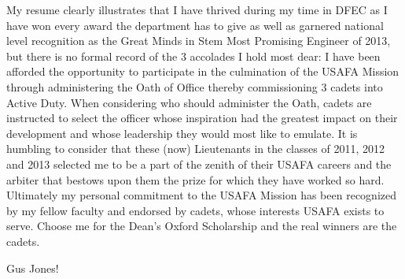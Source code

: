 \documentclass{article}
\begin{document}
My resume clearly illustrates that I have thrived during my time in DFEC as I
have won every award the department has to give as well as garnered national
level recognition as the Great Minds in Stem Most Promising Engineer of 2013,
but there is no formal record of the 3 accolades I hold most dear: I have been
afforded the opportunity to participate in the culmination of the USAFA Mission
through administering the Oath of Office thereby commissioning 3 cadets into
Active Duty. When considering who should administer the Oath, cadets are
instructed to select the officer whose inspiration had the greatest impact on
their development and whose leadership they would most like to emulate. It is
humbling to consider that these (now) Lieutenants in the classes of 2011, 2012
and 2013 selected me to be a part of the zenith of their USAFA careers and the
arbiter that bestows upon them the prize for which they have worked so hard.
Ultimately my personal commitment to the USAFA Mission has been recognized by
my fellow faculty and endorsed by cadets, whose interests USAFA exists to
serve. Choose me for the Dean's
Oxford Scholarship and the real winners are the cadets.

Gus Jones!
\end{document}
